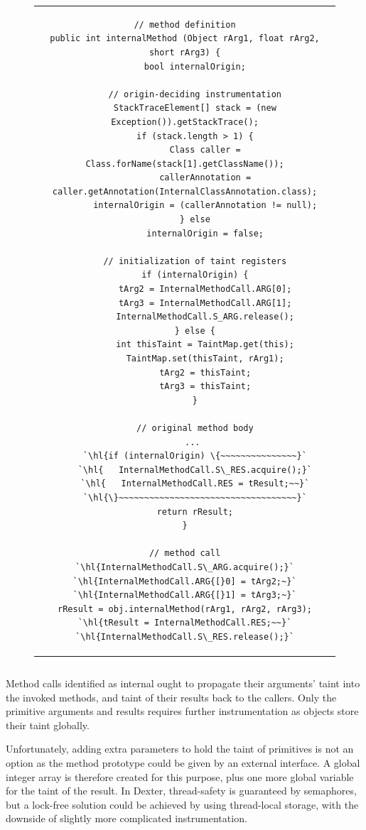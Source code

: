 \documentclass[12pt,twoside,notitlepage]{report}
\begin{document}
\begin{figure}
	\centering
	\begin{tabular}{c}
	\begin{lstlisting}
// method definition
public int internalMethod (Object rArg1, float rArg2, short rArg3) {
	bool internalOrigin;

	// origin-deciding instrumentation
	StackTraceElement[] stack = (new Exception()).getStackTrace();
	if (stack.length > 1) {
		Class caller = Class.forName(stack[1].getClassName());
		callerAnnotation = caller.getAnnotation(InternalClassAnnotation.class);
		internalOrigin = (callerAnnotation != null);
	} else
		internalOrigin = false;

	// initialization of taint registers
	if (internalOrigin) {
		tArg2 = InternalMethodCall.ARG[0];
		tArg3 = InternalMethodCall.ARG[1];
		InternalMethodCall.S_ARG.release();
	} else {
		int thisTaint = TaintMap.get(this);
		TaintMap.set(thisTaint, rArg1);
		tArg2 = thisTaint;
		tArg3 = thisTaint;
	}

	// original method body
	... 
	`\hl{if (internalOrigin) \{~~~~~~~~~~~~~~~}`
	`\hl{	InternalMethodCall.S\_RES.acquire();}`
	`\hl{	InternalMethodCall.RES = tResult;~~}`
	`\hl{\}~~~~~~~~~~~~~~~~~~~~~~~~~~~~~~~~~~~}`
	return rResult;
}

// method call
`\hl{InternalMethodCall.S\_ARG.acquire();}`
`\hl{InternalMethodCall.ARG{[}0] = tArg2;~}`
`\hl{InternalMethodCall.ARG{[}1] = tArg3;~}`
rResult = obj.internalMethod(rArg1, rArg2, rArg3);
`\hl{tResult = InternalMethodCall.RES;~~}`
`\hl{InternalMethodCall.S\_RES.release();}`
	\end{lstlisting}
	\end{tabular}
	\begin{lstlisting}[caption={Instrumentation of internal method calls and origin-deciding logic.},
	                   label={listing:TaintPropagation_InternalMethodCall}]
	\end{lstlisting}
\end{figure}

Method calls identified as internal ought to propagate their arguments' taint into the invoked methods, and taint of their results back to the callers. Only the primitive arguments and results requires further instrumentation as objects store their taint globally. 

Unfortunately, adding extra parameters to hold the taint of primitives is not an option as the method prototype could be given by an external interface. A global integer array is therefore created for this purpose, plus one more global variable for the taint of the result. In Dexter, thread-safety is guaranteed by semaphores, but a lock-free solution could be achieved by using thread-local storage, with the downside of slightly more complicated instrumentation.
\end{document}
